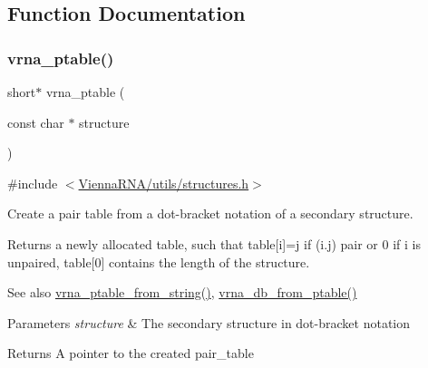 \subsection{Function Documentation}
\mbox{\label{group__struct__utils__pair__table_gae829fb8bb7f694c12a9c0bbc34c77c60}} 
\subsubsection{\texorpdfstring{vrna\+\_\+ptable()}{vrna\_ptable()}}
{\footnotesize\ttfamily short$\ast$ vrna\+\_\+ptable (\begin{DoxyParamCaption}\item[{const char $\ast$}]{structure }\end{DoxyParamCaption})}



{\ttfamily \#include $<$\hyperlink{utils_2structures_8h}{Vienna\+R\+N\+A/utils/structures.\+h}$>$}



Create a pair table from a dot-\/bracket notation of a secondary structure. 

Returns a newly allocated table, such that table\mbox{[}i\mbox{]}=j if (i.\+j) pair or 0 if i is unpaired, table\mbox{[}0\mbox{]} contains the length of the structure.

\begin{DoxySeeAlso}{See also}
\hyperlink{group__struct__utils__pair__table_gac76c9ef3de507748fb0416a59323362b}{vrna\+\_\+ptable\+\_\+from\+\_\+string()}, \hyperlink{group__struct__utils__dot__bracket_gaf9ecd0d7877fecdbb0292e24f40283d5}{vrna\+\_\+db\+\_\+from\+\_\+ptable()}
\end{DoxySeeAlso}

\begin{DoxyParams}{Parameters}
{\em structure} & The secondary structure in dot-\/bracket notation \\
\hline
\end{DoxyParams}
\begin{DoxyReturn}{Returns}
A pointer to the created pair\+\_\+table 
\end{DoxyReturn}
\mbox{\label{group__struct__utils__pair__table_gac76c9ef3de507748fb0416a59323362b}} 
